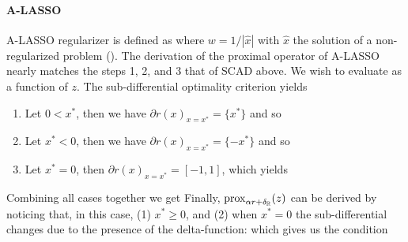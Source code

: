 \paragraph{A-LASSO}

A-LASSO regularizer is defined as 
where $w=1/|\hat{x}|$ with $\hat{x}$ the solution of a non-regularized problem (\cite{Zou2006}). 
The derivation of the proximal operator of A-LASSO nearly matches the steps 1, 2, and 3 that of SCAD above. We wish to evaluate
as a function of $z$.
The sub-differential optimality criterion yields
\begin{enumerate}
\item Let $0 < x^*$, then we have $\partial r(x)_{x = x^*} = \{x^*\}$ and so
    \item Let $x^* < 0$, then we have $\partial r(x)_{x = x^*} = \{-x^*\}$ and so
    \item Let $x^* = 0$, then $\partial r(x)_{x = x^*} = [-1, 1]$, which yields
\end{enumerate}
Combining all cases together we get
Finally, ${\mathrm{prox}}_{\alpha r + \delta_{\operatorname{\mathbb{R}}}}(z)$ can be derived by noticing that, in this case, (1) $x^* \geq 0$, and (2) when $x^* = 0$ the sub-differential changes due to the presence of the delta-function:
which gives us the condition 


